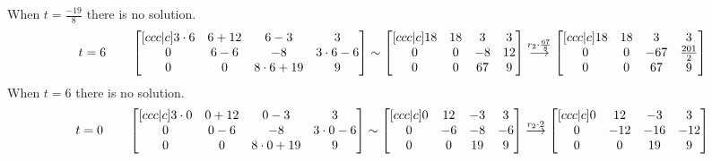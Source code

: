 \documentclass[12pt]{article}
\begin{document}
When $t=\frac{-19}{8}$ there is no solution.
$$
t = 6
\hspace*{20pt}
\begin{bmatrix}[ccc|c]
   3\cdot6 & 6+12 & 6-3 & 3 \\
   0 & 6-6 & -8 & 3\cdot6-6 \\
   0 & 0 & 8\cdot6+19 & 9 \\
\end{bmatrix}
\sim
\begin{bmatrix}[ccc|c]
  18 & 18 & 3 & 3 \\
   0 & 0 & -8 & 12 \\
   0 & 0 & 67 & 9 \\
\end{bmatrix}
\overset{r_2\cdot\frac{67}{8}}{\longrightarrow}
\begin{bmatrix}[ccc|c]
  18 & 18 & 3 & 3 \\
   0 & 0 & -67 & \frac{201}{2} \\
   0 & 0 & 67 & 9 \\
\end{bmatrix}
$$
\newpage
When $t=6$ there is no solution.
$$
t = 0
\hspace*{20pt}
\begin{bmatrix}[ccc|c]
   3\cdot0 & 0+12 & 0-3 & 3 \\
   0 & 0-6 & -8 & 3\cdot0-6 \\
   0 & 0 & 8\cdot0+19 & 9 \\
\end{bmatrix}
\sim
\begin{bmatrix}[ccc|c]
  0 & 12 & -3 & 3 \\
   0 & -6 & -8 & -6 \\
   0 & 0 & 19 & 9 \\
\end{bmatrix}
\overset{r_2\cdot2}{\longrightarrow}
\begin{bmatrix}[ccc|c]
   0 & 12 & -3 & 3 \\
   0 & -12 & -16 & -12 \\
   0 & 0 & 19 & 9 \\
\end{bmatrix}
$$
\end{document}
